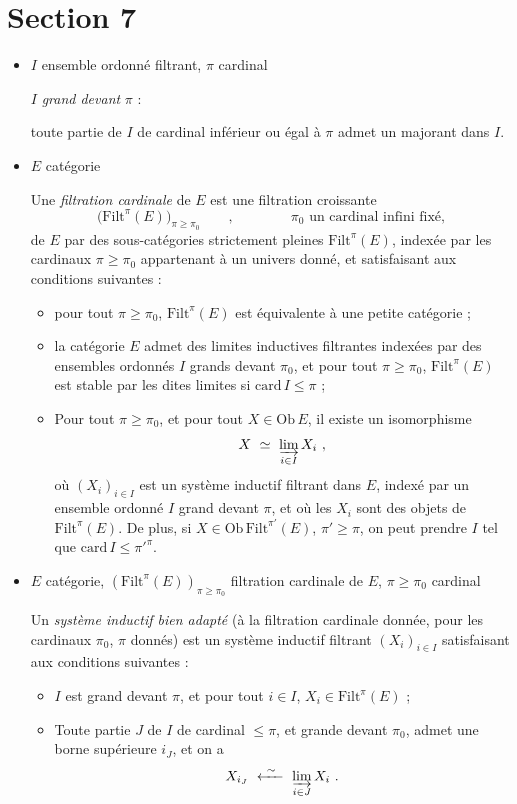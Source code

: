\documentclass[11pt]{article}
\newcommand{\Filt}{\mathrm{Filt}}
\begin{document}
\section*{Section 7}

\begin{itemize}
\item[\textbullet] $I$ ensemble ordonné filtrant, \quad $\pi$ cardinal

$I$ \textit{grand devant} $\pi$ :

toute partie de $I$ de cardinal inférieur ou égal à $\pi$ admet un majorant dans $I$.

\item[\textbullet] $E$ catégorie

Une \textit{filtration cardinale} de $E$ est une filtration croissante
\[
\Big(\Filt^{\pi}(E)\Big)_{\pi\geq\pi_0} \qquad , \qquad\qquad \pi_0 \text{ un cardinal infini fixé,}
\]
de $E$ par des sous-catégories strictement pleines $\Filt^{\pi}(E)$, indexée par les cardinaux $\pi \geq \pi_0$ appartenant à un univers donné, et satisfaisant aux conditions suivantes :
\begin{itemize}
\item[\textit{a})] pour tout $\pi \geq \pi_0$, $\Filt^{\pi}(E)$ est équivalente à une petite catégorie ;
\item[\textit{b})] la catégorie $E$ admet des limites inductives filtrantes indexées par des ensembles ordonnés $I$ grands devant $\pi_0$, et pour tout $\pi \geq \pi_0$, $\Filt^{\pi}(E)$ est stable par les dites limites si $\mathrm{card}\, I \leq \pi$ ;
\item[\textit{c})] Pour tout $\pi \geq \pi_0$, et pour tout $X \in \mathrm{Ob}\, E$, il existe un isomorphisme
\[
X \ \simeq\ \varinjlim_{i\in I} X_i \ ,
\]
où $(X_i)_{i\in I}$ est un système inductif filtrant dans $E$, indexé par un ensemble ordonné $I$ grand devant $\pi$, et où les $X_i$ sont des objets de $\Filt^{\pi}(E)$. De plus, si $X \in \mathrm{Ob}\,\Filt^{\pi'}(E)$, $\pi' \geq \pi$, on peut prendre $I$ tel que $\mathrm{card}\, I \leq \pi'^{\pi}$.
\end{itemize}

\item[\textbullet] $E$ catégorie, \quad $(\Filt^{\pi}(E))_{\pi\geq\pi_0}$ filtration cardinale de $E$, \quad $\pi \geq \pi_0$ cardinal

Un \textit{système inductif bien adapté} (à la filtration cardinale donnée, pour les cardinaux $\pi_0$, $\pi$ donnés) est un système inductif filtrant $(X_i)_{i\in I}$ satisfaisant aux conditions suivantes :
\begin{itemize}
\item[\textit{a})] $I$ est grand devant $\pi$, et pour tout $i \in I$, $X_i \in \Filt^{\pi}(E)$ ;
\item[\textit{b})] Toute partie $J$ de $I$ de cardinal $\leq \pi$, et grande devant $\pi_0$, admet une borne supérieure $i_J$, et on a
\[
X_{i_J} \ \xleftarrow{\ \sim\ }\ \varinjlim_{i\in J} X_i \ .
\]
\end{itemize}


\end{itemize}
\end{document}

